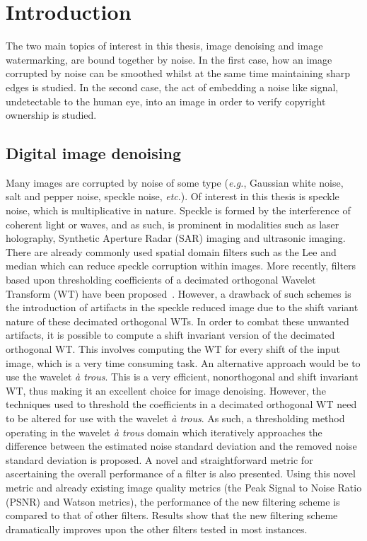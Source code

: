 \documentclass[12pt]{report}
\begin{document}
\clearpage

\setlength{\topskip}{0cm}





\chapter{Introduction}
\label{ch:introAbSumComb}

The two main topics of interest in this thesis, image denoising and image watermarking, are bound together by noise.
In the first case, how an image corrupted by noise can be smoothed whilst at the same time maintaining sharp edges is studied.
In the second case, the act of embedding a noise like signal, undetectable to the human eye,
into an image in order to verify copyright ownership is studied.

\section{Digital image denoising}
Many images are corrupted by noise of some type (\emph{e.g.}, Gaussian white noise, salt and pepper noise, speckle noise, \emph{etc}.).
Of interest in this thesis is speckle noise, which is multiplicative in nature. Speckle is formed by the interference of coherent light or 
waves, and as such, is prominent in modalities such as laser holography, Synthetic Aperture Radar (SAR) imaging and ultrasonic imaging.
There are already commonly used spatial domain filters such as the Lee and median which can reduce speckle corruption within images.
More recently, filters based upon thresholding coefficients of a decimated orthogonal Wavelet Transform (WT) have been proposed~\cite{yu96, don95}. 
However, a drawback of such schemes is the introduction of artifacts in the speckle reduced image due to the shift variant nature of 
these decimated orthogonal WTs.
In order to combat these unwanted artifacts, it is possible to compute a shift invariant version of the decimated orthogonal WT.
This involves computing the WT for every shift of the input image, which is a very time consuming task. 
An alternative approach would be to use the wavelet \emph{\`a trous}. This is a very efficient, nonorthogonal and shift invariant 
WT, thus making it an excellent choice for image denoising. 
However, the techniques used to threshold the coefficients in a decimated orthogonal WT need to
be altered for use with the wavelet \emph{\`a trous}. As such, a thresholding method operating in the wavelet \emph{\`a trous}
domain which iteratively approaches the difference
between the estimated noise standard deviation and the removed noise standard deviation is proposed. 
A novel and straightforward metric for ascertaining the overall performance of a filter is also presented. Using
this novel metric and already existing image quality metrics (the Peak Signal to Noise Ratio (PSNR) and Watson metrics), 
the performance of the new filtering scheme is compared to that of 
other filters. Results show that the new filtering scheme dramatically improves upon the other filters tested in most instances. 
\end{document}

